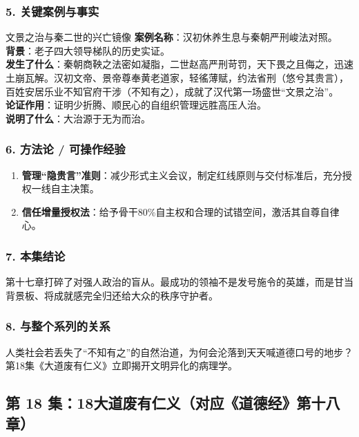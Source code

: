 \subsubsection{5. 关键案例与事实}
\begin{CaseBox}{文景之治与秦二世的兴亡镜像}
\textbf{案例名称}：汉初休养生息与秦朝严刑峻法对照。\\
\textbf{背景}：老子四大领导梯队的历史实证。\\
\textbf{发生了什么}：秦朝商鞅之法密如凝脂，二世赵高严刑苛罚，天下畏之且侮之，迅速土崩瓦解。汉初文帝、景帝尊奉黄老道家，轻徭薄赋，约法省刑（悠兮其贵言），百姓安居乐业不知官府干涉（不知有之），成就了汉代第一场盛世“文景之治”。\\
\textbf{论证作用}：证明少折腾、顺民心的自组织管理远胜高压人治。\\
\textbf{说明了什么}：大治源于无为而治。
\end{CaseBox}

\subsubsection{6. 方法论 / 可操作经验}
\begin{enumerate}
    \item \textbf{管理“隐贵言”准则}：减少形式主义会议，制定红线原则与交付标准后，充分授权一线自主决策。
    \item \textbf{信任增量授权法}：给予骨干80\%自主权和合理的试错空间，激活其自尊自律心。
\end{enumerate}

\subsubsection{7. 本集结论}
第十七章打碎了对强人政治的盲从。最成功的领袖不是发号施令的英雄，而是甘当背景板、将成就感完全归还给大众的秩序守护者。

\subsubsection{8. 与整个系列的关系}
人类社会若丢失了“不知有之”的自然治道，为何会沦落到天天喊道德口号的地步？第18集《大道废有仁义》立即揭开文明异化的病理学。

\clearpage

\subsection{第 18 集：18大道废有仁义（对应《道德经》第十八章）}
\label{sec:ep18}

